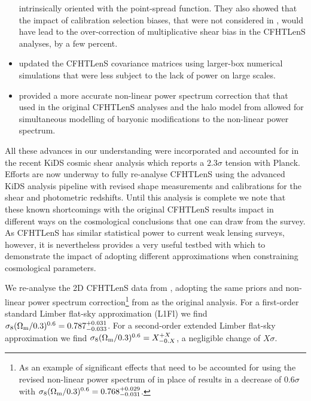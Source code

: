 \begin{itemize}
{intrinsically oriented with the point-spread function.  They also showed that
the impact of calibration selection biases, that were not considered in
\citet{CFHTLenS-shapes}, would have lead to the over-correction of
multiplicative shear bias in the CFHTLenS analyses, by a few percent.}
%
\item{\citet{joudaki/etal:2016} updated the CFHTLenS covariance matrices using
larger-box numerical simulations that were less subject to the lack of power on
large scales.}
\item{\cite{2012ApJ...761..152T} provided a more accurate non-linear power
spectrum correction that that used in the original CFHTLenS analyses and the
halo model from \cite{2015MNRAS.454.1958M} allowed for simultaneous modelling
of baryonic modifications to the non-linear power spectrum.} 
%
\end{itemize}
%
All these advances in our understanding were incorporated and accounted for in
the recent KiDS cosmic shear analysis \citep{KiDS-450} which reports a $2.3
\sigma$ tension with Planck.  Efforts are now underway to fully re-analyse
CFHTLenS using the advanced KiDS analysis pipeline with revised shape
measurements and calibrations for the shear and photometric redshifts.  Until
this analysis is complete we note that these known shortcomings with the
original CFHTLenS results impact in different ways on the cosmological
conclusions that one can draw from the survey.  As CFHTLenS has similar
statistical power to current weak lensing surveys, however, it is nevertheless
provides a very useful testbed with which to demonstrate the impact of adopting
different approximations when constraining cosmological parameters.

We re-analyse the 2D CFHTLenS data from \cite{CFHTLenS-2pt-notomo}, adopting
the same priors and non-linear power spectrum correction\footnote{As an example
of significant effects that need to be accounted for using the revised
non-linear power spectrum of \cite{2012ApJ...761..152T} in place of
\cite{2003MNRAS.341.1311S} results in a decrease of $0.6 \sigma$ with $\sigma_8
(\Omega_{\rm m}/0.3)^{0.6} =0.768^{+0.029}_{-0.031}$.} from
\cite{2003MNRAS.341.1311S} as the original \cite{CFHTLenS-2pt-notomo} analysis.
For a first-order standard Limber flat-sky approximation (L1Fl) we find
$\sigma_8 (\Omega_{\rm m}/0.3)^{0.6} =0.787^{+0.031}_{-0.033}$.   For a
second-order extended Limber flat-sky approximation we find $\sigma_8
(\Omega_{\rm m}/0.3)^{0.6} =X^{+X}_{-0.X}$, a negligible change of $X\sigma$. 

